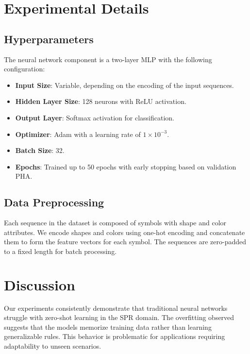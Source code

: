 \documentclass{article} %
\begin{document}
\section{Experimental Details}
\label{sec:experimental_details}

\subsection{Hyperparameters}

The neural network component is a two-layer MLP with the following configuration:

\begin{itemize}
    \item \textbf{Input Size}: Variable, depending on the encoding of the input sequences.
    \item \textbf{Hidden Layer Size}: 128 neurons with ReLU activation.
    \item \textbf{Output Layer}: Softmax activation for classification.
    \item \textbf{Optimizer}: Adam with a learning rate of $1 \times 10^{-3}$.
    \item \textbf{Batch Size}: 32.
    \item \textbf{Epochs}: Trained up to 50 epochs with early stopping based on validation PHA.
\end{itemize}

\subsection{Data Preprocessing}

Each sequence in the dataset is composed of symbols with shape and color attributes. We encode shapes and colors using one-hot encoding and concatenate them to form the feature vectors for each symbol. The sequences are zero-padded to a fixed length for batch processing.

\section{Discussion}
\label{sec:discussion}

Our experiments consistently demonstrate that traditional neural networks struggle with zero-shot learning in the SPR domain. The overfitting observed suggests that the models memorize training data rather than learning generalizable rules. This behavior is problematic for applications requiring adaptability to unseen scenarios.
\end{document}
